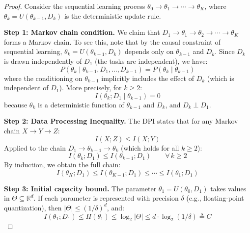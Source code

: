 \documentclass{article}
\begin{document}
\begin{proof}
Consider the sequential learning process $\theta_0 \to \theta_1 \to \cdots \to \theta_K$, where $\theta_k = U(\theta_{k-1}, D_k)$ is the deterministic update rule.

\textbf{Step 1: Markov chain condition.}
We claim that $D_1 \to \theta_1 \to \theta_2 \to \cdots \to \theta_K$ forms a Markov chain. To see this, note that by the causal constraint of sequential learning, $\theta_k = U(\theta_{k-1}, D_k)$ depends only on $\theta_{k-1}$ and $D_k$. Since $D_k$ is drawn independently of $D_1$ (the tasks are independent), we have:
\begin{equation}
    P(\theta_k \mid \theta_{k-1}, D_1, \ldots, D_{k-1}) = P(\theta_k \mid \theta_{k-1})
\end{equation}
where the conditioning on $\theta_{k-1}$ implicitly includes the effect of $D_k$ (which is independent of $D_1$). More precisely, for $k \geq 2$:
\begin{equation}
    I(\theta_k ; D_1 \mid \theta_{k-1}) = 0
\end{equation}
because $\theta_k$ is a deterministic function of $\theta_{k-1}$ and $D_k$, and $D_k \perp D_1$.

\textbf{Step 2: Data Processing Inequality.}
The DPI \citep{cover2006elements} states that for any Markov chain $X \to Y \to Z$:
\begin{equation}
    I(X; Z) \leq I(X; Y)
\end{equation}
Applied to the chain $D_1 \to \theta_{k-1} \to \theta_k$ (which holds for all $k \geq 2$):
\begin{equation}
    I(\theta_k ; D_1) \leq I(\theta_{k-1}; D_1) \qquad \forall \, k \geq 2
\end{equation}
By induction, we obtain the full chain:
\begin{equation}
    I(\theta_K; D_1) \leq I(\theta_{K-1}; D_1) \leq \cdots \leq I(\theta_1; D_1)
\end{equation}

\textbf{Step 3: Initial capacity bound.}
The parameter $\theta_1 = U(\theta_0, D_1)$ takes values in $\Theta \subseteq \mathbb{R}^d$. If each parameter is represented with precision $\delta$ (e.g., floating-point quantization), then $|\Theta| \leq (1/\delta)^d$, and:
\begin{equation}
    I(\theta_1; D_1) \leq H(\theta_1) \leq \log_2 |\Theta| \leq d \cdot \log_2(1/\delta) \triangleq C
\end{equation}


\end{proof}
\end{document}
